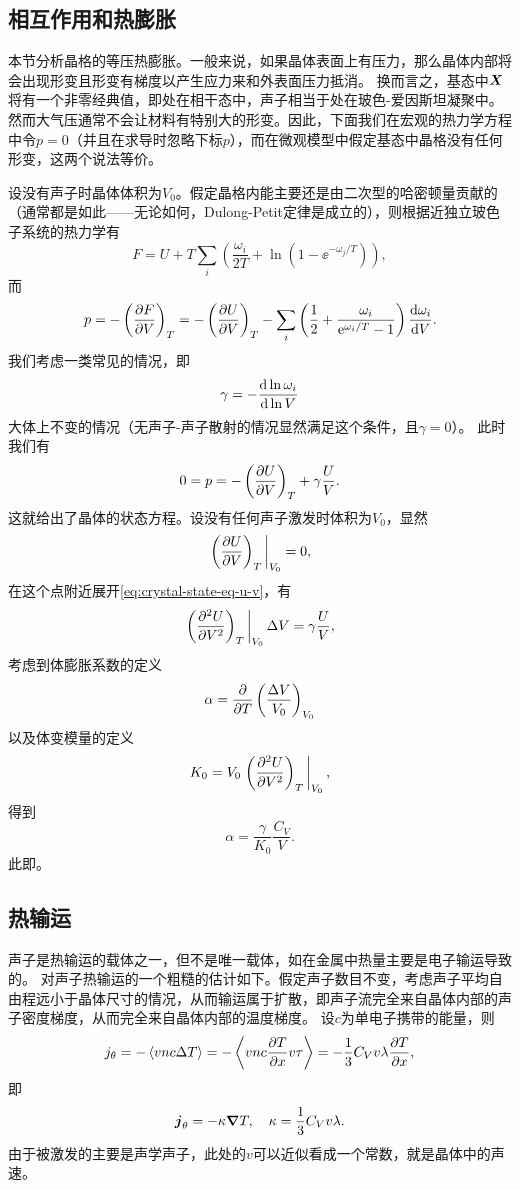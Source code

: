 \subsection{相互作用和热膨胀}

本节分析晶格的等压热膨胀。一般来说，如果晶体表面上有压力，那么晶体内部将会出现形变且形变有梯度以产生应力来和外表面压力抵消。
换而言之，基态中$\vb*{X}$将有一个非零经典值，即处在相干态中，声子相当于处在玻色-爱因斯坦凝聚中。
然而大气压通常不会让材料有特别大的形变。因此，下面我们在宏观的热力学方程中令$p=0$（并且在求导时忽略下标$p$），而在微观模型中假定基态中晶格没有任何形变，这两个说法等价。

设没有声子时晶体体积为$V_0$。假定晶格内能主要还是由二次型的哈密顿量贡献的（通常都是如此——无论如何，Dulong-Petit定律是成立的），则根据近独立玻色子系统的热力学有
\[
    F = U + T \sum_i \left( \frac{\omega_i}{2 T} + \ln(1 - \ee^{- \omega_j / T}) \right),
\]
而
\[
    p = - \left(\pdv{F}{V}\right)_{T} = - \left(\pdv{U}{V}\right)_T - \sum_i \left( \frac{1}{2} + \frac{\omega_i}{\mathrm{e}^{\omega_i / T} - 1} \right) \dv{\omega_i}{V}.
\]
我们考虑一类常见的情况，即
\begin{equation}
    \gamma = - \dv{\ln \omega_i}{\ln V}
\end{equation}
大体上不变的情况（无声子-声子散射的情况显然满足这个条件，且$\gamma = 0$）。
此时我们有
\begin{equation}
    0 = p = - \left(\pdv{U}{V}\right)_T + \gamma \frac{U}{V}.
    \label{eq:crystal-state-eq-u-v}
\end{equation}
这就给出了晶体的状态方程。设没有任何声子激发时体积为$V_0$，显然
\[
    \eval{\left(\pdv{U}{V}\right)_T}_{V_0} = 0,
\]
在这个点附近展开\eqref{eq:crystal-state-eq-u-v}，有
\[
    \eval{\left(\pdv[2]{U}{V}\right)_T}_{V_0} \Delta V = \gamma \frac{U}{V},
\]
考虑到体膨胀系数的定义
\[
    \alpha = \pdv{T} \left(\frac{\Delta V}{V_0}\right)_{V_0}
\]
以及体变模量的定义
\[
    K_0 = V_0 \eval{\left(\pdv[2]{U}{V}\right)_T}_{V_0},
\]
得到
\begin{equation}
    \alpha = \frac{\gamma}{K_0} \frac{C_V}{V}.
\end{equation}
此即。

\subsection{热输运}

声子是热输运的载体之一，但不是唯一载体，如在金属中热量主要是电子输运导致的。
对声子热输运的一个粗糙的估计如下。假定声子数目不变，考虑声子平均自由程远小于晶体尺寸的情况，从而输运属于扩散，即声子流完全来自晶体内部的声子密度梯度，从而完全来自晶体内部的温度梯度。
设$c$为单电子携带的能量，则
\[
    j_\theta = - \expval*{v n c \Delta T} = - \expval{v n c \pdv{T}{x} v \tau} = - \frac{1}{3} C_V v \lambda \pdv{T}{x},
\]
即
\begin{equation}
    \vb*{j}_\theta = -\kappa \grad{T}, \quad \kappa = \frac{1}{3} C_V v \lambda.
\end{equation}
由于被激发的主要是声学声子，此处的$v$可以近似看成一个常数，就是晶体中的声速。

